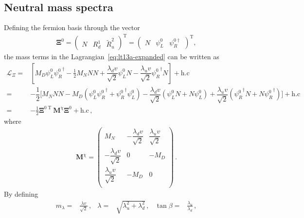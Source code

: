 \subsection{Neutral mass spectra}
%
Defining the fermion basis through the vector
\begin{align}
\label{eq:vecgauge}
\boldsymbol{\Xi}^{0}=
\begin{pmatrix}
N & R_d^1 & \widetilde{R}_u^2   
\end{pmatrix}^{\operatorname{T}}=
\begin{pmatrix}
N & \psi_L^0 & \psi_R^{0\dagger}
\end{pmatrix}^{\operatorname{T}},
\end{align} 
the mass terms in the Lagrangian~\eqref{eq:lt13a-expanded} can be written as
\begin{align}
\label{eq:neutral_lagrangian}
\mathcal{L}_{\Xi}
=& \left[ M_D\psi_L^0{\psi_{R}^0 }^{\dagger}-\tfrac{1}{2}M_N NN
+\dfrac{\lambda_d v}{\sqrt{2}}\psi_L^0N 
- \dfrac{\lambda_u v}{\sqrt{2}} {\psi_R^0}^{\dagger}N\right] +\text{h.c}\nonumber\\
=&-\dfrac{1}{2}\bigg[M_N NN - M_D(\psi_L^0{\psi_{R}^0 }^{\dagger}+{\psi_{R}^0 }^{\dagger}\psi_L^0)
-\dfrac{\lambda_d v}{\sqrt{2}}(\psi_L^0N+N\psi_L^0) 
+\dfrac{\lambda_u v}{\sqrt{2}} ({\psi_R^0}^{\dagger}N+N{\psi_R^0}^{\dagger})\bigg] +\text{h.c}
\nonumber\\
  =&-\frac{1}{2}
\boldsymbol{\Xi}^{0\operatorname{T}}
\mathbf{M}^{\chi}\boldsymbol{\Xi}^0
+\text{h.c}\,,
\end{align}
where
\begin{align}
\label{eq:Mchis}
  \mathbf{M}^{\chi}=\begin{pmatrix}
  M_N                 &-\dfrac{\lambda_d v}{\sqrt{2}}&\dfrac{\lambda_u v}{\sqrt{2}}\\
-\dfrac{\lambda_d v}{\sqrt{2}} &  0                  & -M_D\\
\dfrac{\lambda_u v}{\sqrt{2}}&  -M_D                &  0  \\
\end{pmatrix}\,.
\end{align} 
By defining
\begin{align}
  \label{eq:etabeta}
m_{\lambda}=&  \frac{\lambda v }{\sqrt{2}}\,,&
  \lambda=&\sqrt{\lambda_u^2+\lambda_d^2}\,,&
  \tan\beta=&\frac{\lambda_u}{\lambda_d}\, ,
\end{align}
